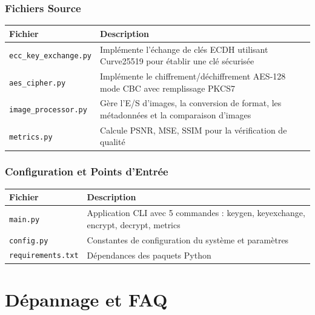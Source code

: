 \documentclass[12pt,a4paper]{report}
\begin{document}
\subsection{Fichiers Source}

\begin{table}[H]
    \centering
    \begin{tabular}{|l|p{8cm}|}
    \hline
    \textbf{Fichier} & \textbf{Description} \\
    \hline
    \texttt{ecc\_key\_exchange.py} & Implémente l'échange de clés ECDH utilisant Curve25519 pour établir une clé sécurisée \\
    \texttt{aes\_cipher.py} & Implémente le chiffrement/déchiffrement AES-128 mode CBC avec remplissage PKCS7 \\
    \texttt{image\_processor.py} & Gère l'E/S d'images, la conversion de format, les métadonnées et la comparaison d'images \\
    \texttt{metrics.py} & Calcule PSNR, MSE, SSIM pour la vérification de qualité \\
    \hline
    \end{tabular}
\end{table}

\subsection{Configuration et Points d'Entrée}

\begin{table}[H]
    \centering
    \begin{tabular}{|l|p{8cm}|}
    \hline
    \textbf{Fichier} & \textbf{Description} \\
    \hline
    \texttt{main.py} & Application CLI avec 5 commandes : keygen, keyexchange, encrypt, decrypt, metrics \\
    \texttt{config.py} & Constantes de configuration du système et paramètres \\
    \texttt{requirements.txt} & Dépendances des paquets Python \\
    \hline
    \end{tabular}
\end{table}

\chapter{Dépannage et FAQ}
\end{document}
